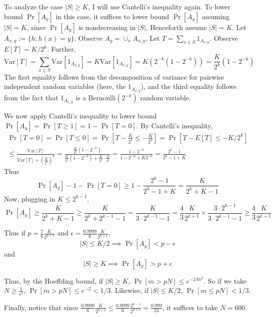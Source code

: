 \documentclass{article}
\def \Var{\text{Var}}
\begin{document}
To analyze the case $|S| \geq K$, I will use Cantelli's inequality again.
To lower bound $\Pr[A_y]$ in this case, it suffices to lower bound $\Pr[A_y]$
assuming $|S| = K$, since $\Pr[A_y]$ is nondecreasing in $|S|$.
Henceforth assume $|S| = K$.
Let $A_{x, y} := \{h : h(x) = y\}$.  Observe $A_y = \cup_x A_{x, y}$.
Let $T = \sum_{x \in S} 1_{A_{x, y}}$.
Observe $E[T] = K/2^k$.
Further,
$$
\Var[T] = \sum_{x \in S} \Var[1_{A_{x, y}}] = K \Var[1_{A_{x, y}}] = K(2^{-k}(1 - 2^{-k})) = \frac{K}{2^k}(1 - 2^{-k})
$$
The first equality follows from the decomposition of variance for pairwise independent random variables (here, the $1_{A_{x, y}}$), and the third equality follows from the fact that $1_{A_{x, y}}$ is a $\text{Bernoulli}(2^{-k})$ random variable.

We now apply Cantelli's inequality to lower bound $\Pr[A_y] = \Pr[T \geq 1] = 1 - \Pr[T = 0]$.
By Cantelli's inequality,
\begin{multline*}
\Pr[T = 0] = \Pr[T \leq 0] = \Pr[T - \frac{K}{2^k} \leq -\frac{K}{2^{k}}]
= \Pr[T - E[T] \leq -K/2^k] \\
\leq \frac{\Var[T]}{\Var[T] + (\frac{K}{2^k})^2}
 = \frac{
	\frac{K}{2^k}(1 - 2^{-k})
 }{
	\frac{K}{2^k}(1 - 2^{-k}) + \frac{K}{2^k} \cdot \frac{K}{2^k} 
 } =
 \frac{1 - 2^{-k}}{1 - 2^{-k} + K2^{-k}}
 = \frac{2^k - 1}{2^k - 1 + K}
\end{multline*}
Thus
$$
\Pr[A_y] - 1 - \Pr[T = 0] \geq 1 - \frac{2^k - 1}{2^k - 1 + K}
= \frac{K}{2^k + K - 1}
$$
Now, plugging in $K \leq 2^{k-1}$,
$$
\Pr[A_y] \geq \frac{K}{2^k + K - 1} \geq \frac{K}{2^k + 2^{k-1} - 1}
= \frac{K}{3 \cdot 2^{k-1} - 1}
= \frac{4}{3}\frac{K}{2^{k+1}} \times \frac{3 \cdot 2^{k-1}}{3 \cdot 2^{k-1} - 1}
\geq \frac{4}{3}\frac{K}{2^{k+1}}
$$

Thus if $p = \frac{7}{6}\frac{K}{2^{k+1}}$ and $\epsilon = \frac{0.9999}{6}\frac{K}{2^{k+1}}$,
$$
|S| \leq K/2 \implies \Pr[A_y] < p - \epsilon
$$
and
$$
|S| \geq K \implies \Pr[A_y] > p + \epsilon
$$

Thus, by the Hoeffding bound, if $|S| \geq K$, $\Pr[m > p N] \leq e^{-2N \epsilon^2}$.
So if we take $N \geq \frac{1}{\epsilon^2}$, $\Pr[m > p N] \leq e^{-2} < 1/3$.
Likewise, if $|S| \leq K/2$, $\Pr[m \leq pN] < 1/3$.

Finally, notice that since $\frac{0.9999}{6}\frac{K}{2^{k+1}} \leq \frac{0.9999}{6} \frac{2^{k-1}}{2^{k+1}} = \frac{0.999}{24}$,
it suffices to take $N = 600$.
\end{document}
